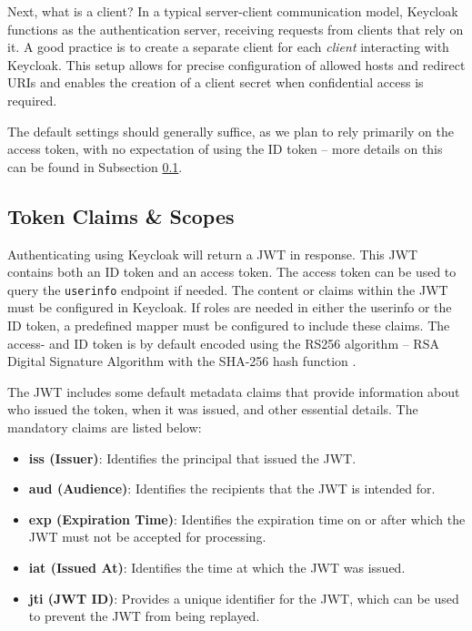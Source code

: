 Next, what is a client? In a typical server-client communication model, Keycloak functions as the authentication server, receiving requests from clients that rely on it. A good practice is to create a separate client for each \textit{client} interacting with Keycloak. This setup allows for precise configuration of allowed hosts and redirect URIs and enables the creation of a client secret when confidential access is required.

The default settings should generally suffice, as we plan to rely primarily on the access token, with no expectation of using the ID token -- more details on this can be found in Subsection \ref{sec:token_claims}.

\subsection{Token Claims \& Scopes}\label{sec:token_claims}
Authenticating using Keycloak will return a JWT in response. This JWT contains both an ID token and an access token. The access token can be used to query the \texttt{userinfo} endpoint if needed. The content or claims within the JWT must be configured in Keycloak. If roles are needed in either the userinfo or the ID token, a predefined mapper must be configured to include these claims. The access- and ID token is by default encoded using the RS256 algorithm -- RSA Digital Signature Algorithm with the SHA-256 hash function .

The JWT includes some default metadata claims that provide information about who issued the token, when it was issued, and other essential details. The mandatory claims are listed below:

\begin{itemize} 
    \item \textbf{iss (Issuer)}: Identifies the principal that issued the JWT.
    \item \textbf{aud (Audience)}: Identifies the recipients that the JWT is intended for. 
    \item \textbf{exp (Expiration Time)}: Identifies the expiration time on or after which the JWT must not be accepted for processing. 
    \item \textbf{iat (Issued At)}: Identifies the time at which the JWT was issued. 
    \item \textbf{jti (JWT ID)}: Provides a unique identifier for the JWT, which can be used to prevent the JWT from being replayed. 
\end{itemize}

